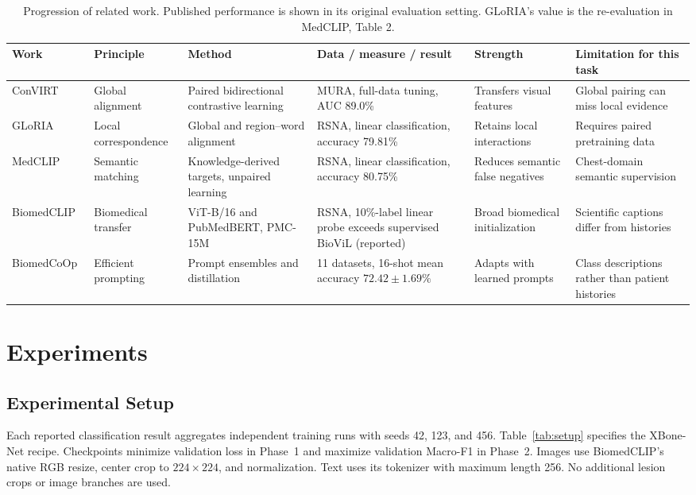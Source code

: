 \documentclass[conference,a4paper]{IEEEtran}
\begin{document}
\begin{table}[t]
\caption{Progression of related work. Published performance is shown in its original evaluation setting. GLoRIA's value is the re-evaluation in MedCLIP, Table 2.}
\label{tab:related}
\centering\footnotesize
\begin{tabularx}{\textwidth}{@{}p{21mm}YYYYY@{}}
\toprule
Work & Principle & Method & Data / measure / result & Strength & Limitation for this task \\
\midrule
ConVIRT~\cite{ConVIRT} & Global alignment & Paired bidirectional contrastive learning & MURA, full-data tuning, AUC 89.0\% & Transfers visual features & Global pairing can miss local evidence \\
GLoRIA~\cite{GLoRIA,MedCLIP} & Local correspondence & Global and region--word alignment & RSNA, linear classification, accuracy 79.81\% & Retains local interactions & Requires paired pretraining data \\
MedCLIP~\cite{MedCLIP} & Semantic matching & Knowledge-derived targets, unpaired learning & RSNA, linear classification, accuracy 80.75\% & Reduces semantic false negatives & Chest-domain semantic supervision \\
BiomedCLIP~\cite{BiomedCLIP} & Biomedical transfer & ViT-B/16 and PubMedBERT, PMC-15M & RSNA, 10\%-label linear probe exceeds supervised BioViL (reported) & Broad biomedical initialization & Scientific captions differ from histories \\
BiomedCoOp~\cite{BiomedCoOp} & Efficient prompting & Prompt ensembles and distillation & 11 datasets, 16-shot mean accuracy $72.42\pm1.69\%$ & Adapts with learned prompts & Class descriptions rather than patient histories \\
\bottomrule
\end{tabularx}
\end{table}



\section{Experiments}
\subsection{Experimental Setup}
Each reported classification result aggregates independent training runs with seeds 42, 123, and 456. Table~\ref{tab:setup} specifies the XBone-Net recipe. Checkpoints minimize validation loss in Phase~1 and maximize validation Macro-F1 in Phase~2. Images use BiomedCLIP's native RGB resize, center crop to $224\times224$, and normalization. Text uses its tokenizer with maximum length 256. No additional lesion crops or image branches are used.
\end{document}
